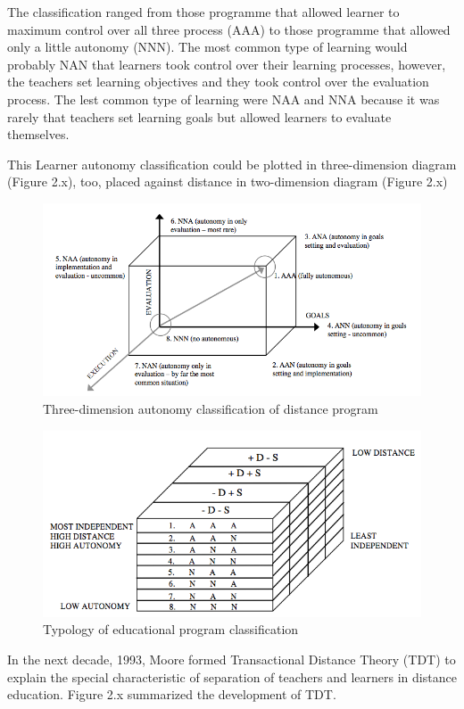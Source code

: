 The classification ranged from those programme that allowed learner to maximum control over all three process (AAA) to those programme that allowed only a little autonomy (NNN). The most common type of learning would probably NAN that learners took control over their learning processes, however, the teachers set learning objectives and they took control over the evaluation process. The lest common type of learning were NAA and NNA because it was rarely that teachers set learning goals but allowed learners to evaluate themselves. 

\newpage
This Learner autonomy classification could be plotted in three-dimension diagram (Figure 2.x), too, placed against distance in two-dimension diagram (Figure 2.x)
\begin{figure}[!hbt]
\centering
\includegraphics[width=1.1\textwidth]{tdt2}
\caption {Three-dimension autonomy classification of distance program \cite[pp. 73]{moore2013handbook}}
\end{figure}

\begin{figure}[!hbt]
\centering
\includegraphics[width=0.85 \textwidth]{tdt3}
\caption {Typology of educational program classification \cite[pp. 73]{moore1983individual}}
\end{figure}

In the next decade, 1993, Moore \cite{moore1993theory} formed Transactional Distance Theory (TDT) to explain the special characteristic of separation of teachers and learners in distance education. Figure 2.x summarized the development of TDT. 

